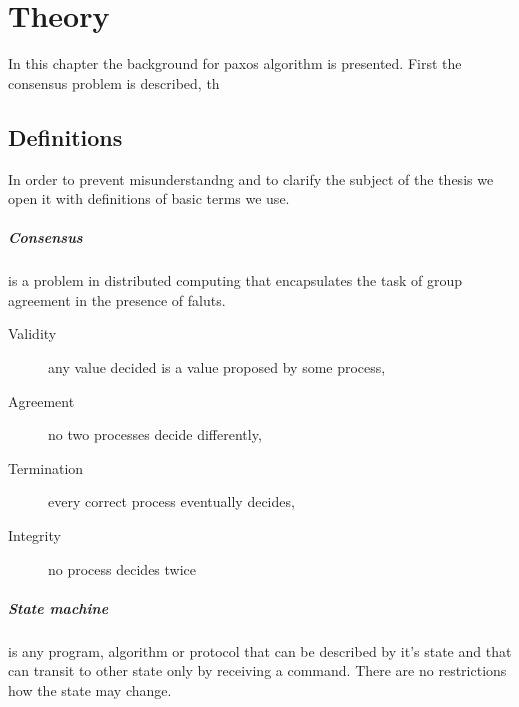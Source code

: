 \chapter{Theory}

%

In this chapter the background for paxos algorithm is presented. First the consensus problem is described, th



\section{Definitions}

In order to prevent misunderstandng and to clarify the subject of the thesis we open it with definitions of
basic %
terms we use.


\paragraph{Consensus}
is a problem in distributed computing that encapsulates the task of group agreement in the presence of faluts.

\begin{description}
    \item[Validity] any value decided is a value proposed by some process,
    \item[Agreement] no two processes decide differently,
    \item[Termination] every correct process eventually decides,
    \item[Integrity] no process decides twice
\end{description}

\paragraph{State machine}
is any program, algorithm or protocol that can be described by it's state and that can transit to other state only by receiving a command.
There are no restrictions how the state may change.

